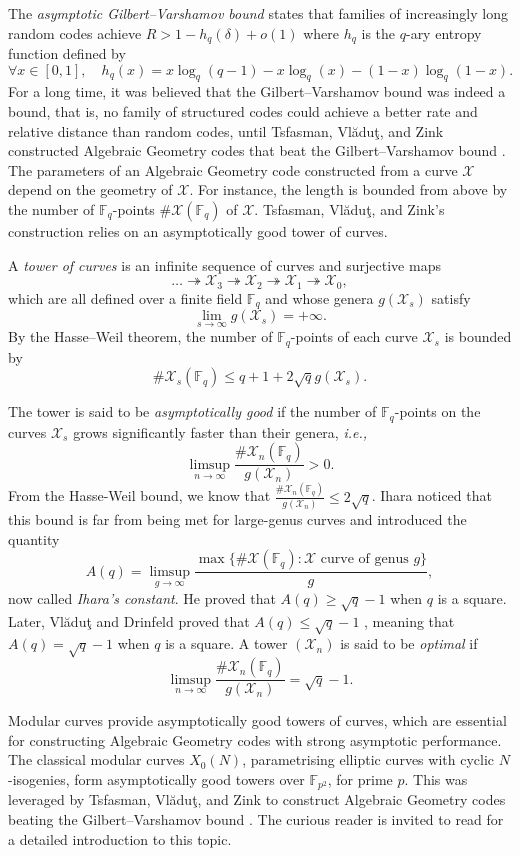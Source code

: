\documentclass[11pt]{article}
\theoremstyle{definition}
\renewcommand\geq{\geqslant}
\renewcommand\leq{\leqslant}
\newcommand\F{\mathbb{F}}
\newcommand\Fq{\mathbb{F}_q}
\newcommand\calX{\mathcal{X}}
\newcommand{\ie}{\textit{i.e.,~}}
\begin{document}
The \emph{asymptotic Gilbert--Varshamov bound} \cite[Proposition~8.4.4]{Sti09} states that families of increasingly long random codes achieve $R > 1 -h_q(\delta) + o(1)$ where $h_q$ is the $q$-ary entropy function defined by \[\forall x \in [0,1], \quad h_q(x)=x\log_q(q-1)-x\log_q(x)-(1-x)\log_q(1-x).\] For a long time, it was believed that the Gilbert--Varshamov bound was indeed a bound, that is, no family of structured codes could achieve a better rate and relative distance than random codes, until Tsfasman, Vlăduţ, and Zink constructed Algebraic Geometry codes that beat the Gilbert--Varshamov bound \cite{TVZ82}. 
The parameters of an Algebraic Geometry code constructed from a curve $\calX$  depend on the geometry of $\calX$. For instance, the length is bounded from above by the number of $\Fq$-points $\#\calX(\Fq)$ of $\calX$. Tsfasman, Vlăduţ, and Zink's construction relies on an asymptotically good tower of curves.

A \emph{tower of curves} is an infinite sequence of curves and surjective maps
\[\dots \twoheadrightarrow \calX_3 \twoheadrightarrow \calX_2 \twoheadrightarrow \calX_1 \twoheadrightarrow \calX_0,\]
which are all defined over a finite field $\Fq$ and whose genera $g(\calX_s)$ satisfy 
\begin{equation}\label{eq:tower}
	\lim_{s \rightarrow \infty} g(\calX_s) = +\infty.
\end{equation}
By the Hasse--Weil theorem, the number of $\Fq$-points of each curve $\calX_s$ is bounded by
\[\#\calX_s(\Fq) \leq q+1+2\sqrt{q}g(\calX_s).\]

The tower is said to be \emph{asymptotically good} if the number of $\Fq$-points on the curves $\calX_s$ grows significantly faster than their genera, \ie
\[\limsup_{n \rightarrow \infty} \frac{\#\calX_n(\Fq)}{g(\calX_n)} > 0.
\] 
From the Hasse-Weil bound, we know that $\frac{\#\calX_n(\Fq)}{g(\calX_n)}\leq 2\sqrt{q}$. Ihara \cite{ihara1981} noticed that this bound is far from being met for large-genus curves and introduced the quantity
\[A(q)=\limsup_{g \rightarrow \infty} \frac{\max\{\#\calX(\Fq) : \calX \text{ curve of genus }g \}}{g}, \]
now called \emph{Ihara's constant}. He proved that $A(q)  \geq \sqrt{q}-1$ when $q$ is a square. Later, Vlăduţ and Drinfeld proved that $A(q) \leq \sqrt{q}-1$
\cite{vluaduct1983}, meaning that $A(q)=\sqrt{q}-1$ when $q$ is a square. A tower $(\calX_n)$ is said to be \emph{optimal} if
\[\limsup_{n \rightarrow \infty} \frac{\#\calX_n(\Fq)}{g(\calX_n)} = \sqrt{q}-1.
\] 

Modular curves provide asymptotically good towers of curves, which are essential for constructing Algebraic Geometry codes with strong asymptotic performance. The classical modular curves $X_0(N)$, parametrising elliptic curves with cyclic $N$-isogenies, form asymptotically good towers over $\F_{p^2}$, for prime $p$. This was leveraged by Tsfasman, Vlăduţ, and Zink to construct Algebraic Geometry codes beating the Gilbert--Varshamov bound \cite{TVZ82}. The curious reader is invited to read \cite{C22survey} for a detailed introduction to this topic.
\end{document}
